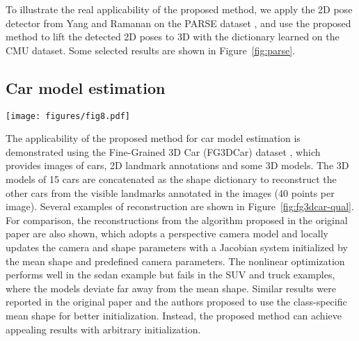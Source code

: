 \documentclass[10pt,journal,cspaper,compsoc]{IEEEtran}
\newcommand{\refFig}[1]{Figure~\ref{#1}}
\begin{document}
To illustrate the real applicability of the proposed method, we apply the 2D pose detector from Yang and Ramanan \cite{yang2011articulated} on the PARSE dataset \cite{ramanan2006learning}, and use the proposed method to lift the detected 2D poses to 3D with the dictionary learned on the CMU dataset. Some selected results are shown in \refFig{fig:parse}.


\subsection{Car model estimation}

\begin{figure*}
  \centering
  \texttt{[image: figures/fig8.pdf]}
  \caption{Qualitative results on the FG3DCar dataset given 2D correspondences. The columns correspond to the original image, the input 2D landmarks, and the 2D/3D models output by the proposed method and the nonlinear optimization \cite{lin2014jointly}, respectively. Only visible landmarks ( per image) are used for model fitting. The 3D models are visualized in a novel view different from the original image. The car models are the BMW 5 Series 2011 (sedan), the Nissan Xterra 2005 (SUV) and the Dodge Ram 2003 (pick-up truck), respectively.} \label{fig:fg3dcar-qual}
\end{figure*}

The applicability of the proposed method for car model estimation is demonstrated using the Fine-Grained 3D Car (FG3DCar) dataset \cite{lin2014jointly}, which provides images of cars, 2D landmark annotations and some 3D models. The 3D models of 15 cars are concatenated as the shape dictionary to reconstruct the other cars from the visible landmarks annotated in the images (40 points per image). Several examples of reconstruction are shown in \refFig{fig:fg3dcar-qual}. For comparison, the reconstructions from the algorithm proposed in the original paper \cite{lin2014jointly} are also shown, which adopts a perspective camera model and locally updates the camera and shape parameters with a Jacobian system initialized by the mean shape and predefined camera parameters. The nonlinear optimization performs well in the sedan example but fails in the SUV and truck examples, where the models deviate far away from the mean shape. Similar results were reported in the original paper \cite{lin2014jointly} and the authors proposed to use the class-specific mean shape for better initialization. Instead, the proposed method can achieve appealing results with arbitrary initialization.
\end{document}
